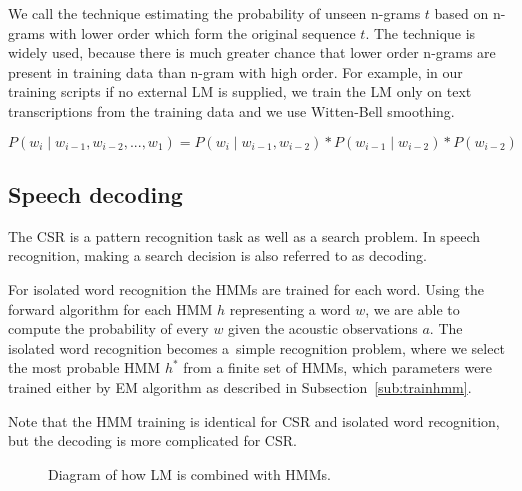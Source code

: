 {
We call the  technique estimating the probability of unseen n-grams $t$ 
based on n-grams with lower order which form the original sequence $t$.
The technique is widely used, because there is much greater chance that lower order n-grams are
present in training data than n-gram with high order.
For example, in our training scripts if no external \ac{LM} is supplied,
we train the \ac{LM} only on text transcriptions from the training data
and we use Witten-Bell smoothing.\cite{witten1991zero}

\begin{equation} \label{eq:ngram}
    P(w_i \mid w_{i-1}, w_{i-2}, ..., w_1) = P(w_i \mid w_{i-1}, w_{i-2}) * P(w_{i-1} \mid w_{i-2}) * P(w_{i-2})
\end{equation}

\subsection{Speech decoding}
\label{sub:decode}
The \ac{CSR} is a pattern recognition task as well as a search problem.
In speech recognition, making a search decision is also referred to as decoding.\cite{huang2001spoken}


For isolated word recognition the \acp{HMM} are trained for each word.
Using the forward algorithm for each \ac{HMM} $h$ representing a word $w$, 
we are able to compute the probability  of every $w$ given the acoustic observations $a$.
The isolated word recognition becomes a~simple recognition problem,
where we select the most probable \ac{HMM} $h^*$ from a finite set of \acp{HMM},
which parameters were trained either by \ac{EM} algorithm as described in Subsection~\ref{sub:trainhmm}.

Note that the \ac{HMM} training is identical for \ac{CSR} and isolated word recognition,
but the decoding is more complicated for \ac{CSR}.

\begin{figure}[!htp]
    \begin{center}
        
        \caption{Diagram of how \ac{LM} is combined with \acp{HMM}.}
        \label{fig:hmm_lm} 
    \end{center}
\end{figure}

}
